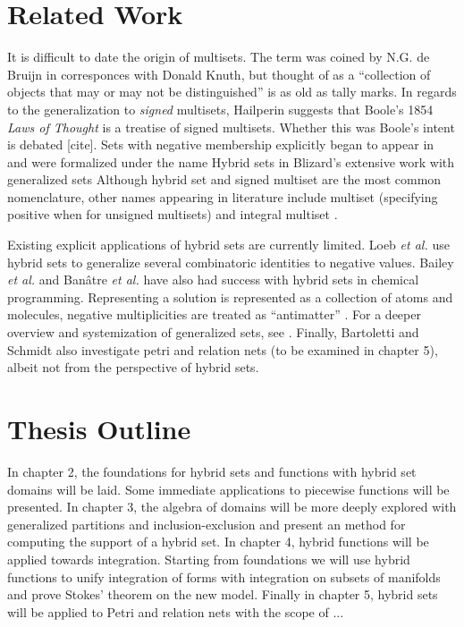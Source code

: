 \section{Related Work}



It is difficult to date the origin of multisets. The term was coined by N.G. de Bruijn in corresponces with Donald Knuth, \cite{knuth2014art}
but thought of as a ``collection of objects that may or may not be distinguished'' is as old as tally marks. 
In regards to the generalization to \emph{signed} multisets, Hailperin \cite{hailperin1986boole} suggests that Boole's 1854 \emph{Laws of Thought} \cite{boole1854investigation} is a treatise of signed multisets.
Whether this was Boole's intent is debated 
[cite]. %
Sets with negative membership explicitly began to appear in \cite{whitney1933characteristic} and were formalized under the name Hybrid sets in Blizard's extensive work with generalized sets \cite{blizard1988, blizard1990} 
Although hybrid set and signed multiset are the most common nomenclature, other names appearing in literature include
multiset (specifying positive when for unsigned multisets) \cite{reisig1985petri} 
and integral multiset \cite{wildberger2003new}. 

Existing explicit applications of hybrid sets are currently limited.
Loeb \emph{et al.} \cite{damiani1991, loeb1992} use hybrid sets to generalize several combinatoric identities to negative values.
Bailey \emph{et al.} \cite{bailey2009hypergraphic} and Ban\^{a}tre \emph{et al.} \cite{banatre2006} have also had success with hybrid sets in chemical programming. 
Representing a solution is represented as a collection of atoms and molecules, negative multiplicities are treated as ``antimatter'' . 
For a deeper overview and systemization of generalized sets, see \cite{singh2007, singh2008systematization}.
Finally, Bartoletti \cite{bartolettilending, bartoletti2013} and Schmidt \cite{schmidt1995parameterized} also investigate petri and relation nets (to be examined in chapter 5), albeit not from the perspective of hybrid sets.



\section{Thesis Outline}



In chapter 2, the foundations for hybrid sets and functions with hybrid set domains will be laid. Some immediate applications to piecewise functions will be presented.
In chapter 3, the algebra of domains will be more deeply explored with generalized partitions and inclusion-exclusion and present an method for computing the support of a hybrid set.
In chapter 4, hybrid functions will be applied towards integration. Starting from foundations we will use hybrid functions to unify integration of forms with integration on subsets of manifolds and prove Stokes' theorem on the new model.
Finally in chapter 5, hybrid sets will be applied to Petri and relation nets with the scope of ...


